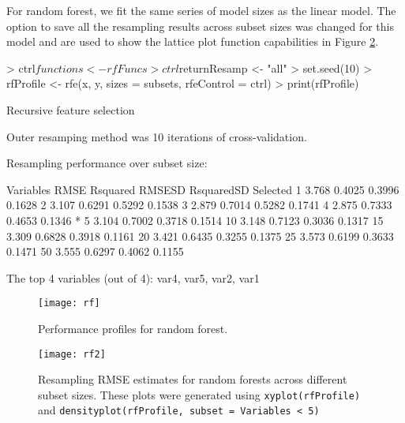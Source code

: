 \documentclass[12pt]{article}
\begin{document}
For random forest, we fit the same series of model sizes as the linear model. The option to save all the resampling results across subset sizes was changed for this model and are used to show the lattice plot function capabilities in Figure \ref{F:rf2}.
\begin{Schunk}
\begin{Sinput}
> ctrl$functions <- rfFuncs
> ctrl$returnResamp <- "all"
> set.seed(10)
> rfProfile <- rfe(x, y, sizes = subsets, rfeControl = ctrl)
> print(rfProfile)
\end{Sinput}
\begin{Soutput}
Recursive feature selection

Outer resamping method was 10 iterations of cross-validation. 

Resampling performance over subset size:

 Variables  RMSE Rsquared RMSESD RsquaredSD Selected
         1 3.768   0.4025 0.3996     0.1628         
         2 3.107   0.6291 0.5292     0.1538         
         3 2.879   0.7014 0.5282     0.1741         
         4 2.875   0.7333 0.4653     0.1346        *
         5 3.104   0.7002 0.3718     0.1514         
        10 3.148   0.7123 0.3036     0.1317         
        15 3.309   0.6828 0.3918     0.1161         
        20 3.421   0.6435 0.3255     0.1375         
        25 3.573   0.6199 0.3633     0.1471         
        50 3.555   0.6297 0.4062     0.1155         

The top 4 variables (out of 4):
   var4, var5, var2, var1
\end{Soutput}
\end{Schunk}

\begin{figure}
   \begin{center}		
      \texttt{[image: rf]}
      \caption{Performance profiles for random forest.}
      \label{F:rf} 
    \end{center}
\end{figure}

\begin{figure}
   \begin{center}		
      \texttt{[image: rf2]}
      \caption{Resampling RMSE estimates for random forests across different subset sizes. These plots were generated using \texttt{xyplot(rfProfile)} and \texttt{densityplot(rfProfile, subset = Variables < 5)}}
      \label{F:rf2} 
    \end{center}
\end{figure}
\end{document}

